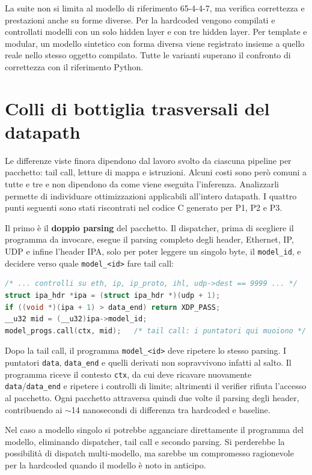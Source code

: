 \documentclass[binding=0.6cm,italian,oneside,noexaminfo]{sapthesis}
\begin{document}
La suite non si limita al modello di riferimento 65-4-4-7, ma verifica correttezza e prestazioni anche su forme diverse. Per la hardcoded vengono compilati e controllati modelli con un solo hidden layer e con tre hidden layer. Per template e modular, un modello sintetico con forma diversa viene registrato insieme a quello reale nello stesso oggetto compilato. Tutte le varianti superano il confronto di correttezza con il riferimento Python.

\section{Colli di bottiglia trasversali del datapath}
\label{sec:bottleneck}

Le differenze viste finora dipendono dal lavoro svolto da ciascuna pipeline per pacchetto: tail call, letture di mappa e istruzioni. Alcuni costi sono però comuni a tutte e tre e non dipendono da come viene eseguita l'inferenza. Analizzarli permette di individuare ottimizzazioni applicabili all'intero datapath. I quattro punti seguenti sono stati riscontrati nel codice C generato per P1, P2 e P3.

Il primo è il \textbf{doppio parsing} del pacchetto. Il dispatcher, prima di scegliere il programma da invocare, esegue il parsing completo degli header, Ethernet, IP, UDP e infine l'header IPA, solo per poter leggere un singolo byte, il \texttt{model\_id}, e decidere verso quale \texttt{model\_<id>} fare tail call:
\begin{lstlisting}[language=C,caption={Il dispatcher parsa tutto solo per leggere \texttt{model\_id}}]
/* ... controlli su eth, ip, ip_proto, ihl, udp->dest == 9999 ... */
struct ipa_hdr *ipa = (struct ipa_hdr *)(udp + 1);
if ((void *)(ipa + 1) > data_end) return XDP_PASS;
__u32 mid = (__u32)ipa->model_id;
model_progs.call(ctx, mid);   /* tail call: i puntatori qui muoiono */
\end{lstlisting}
Dopo la tail call, il programma \texttt{model\_<id>} deve ripetere lo stesso parsing. I puntatori \texttt{data}, \texttt{data\_end} e quelli derivati non sopravvivono infatti al salto. Il programma riceve il contesto \texttt{ctx}, da cui deve ricavare nuovamente \texttt{data}/\texttt{data\_end} e ripetere i controlli di limite; altrimenti il verifier rifiuta l'accesso al pacchetto. Ogni pacchetto attraversa quindi due volte il parsing degli header, contribuendo ai $\sim$14 nanosecondi di differenza tra hardcoded e baseline.

Nel caso a modello singolo si potrebbe agganciare direttamente il programma del modello, eliminando dispatcher, tail call e secondo parsing. Si perderebbe la possibilità di dispatch multi-modello, ma sarebbe un compromesso ragionevole per la hardcoded quando il modello è noto in anticipo.
\end{document}
